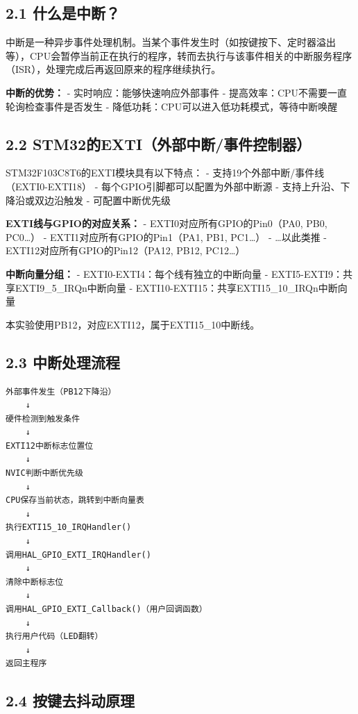 \documentclass[
  chinese,
  UTF8,
  oneside,
  openany]{ctexbook}
\begin{document}
\subsection{2.1 什么是中断？}\label{ux4ec0ux4e48ux662fux4e2dux65ad}

中断是一种异步事件处理机制。当某个事件发生时（如按键按下、定时器溢出等），CPU会暂停当前正在执行的程序，转而去执行与该事件相关的中断服务程序（ISR），处理完成后再返回原来的程序继续执行。

\textbf{中断的优势：} - 实时响应：能够快速响应外部事件 -
提高效率：CPU不需要一直轮询检查事件是否发生 -
降低功耗：CPU可以进入低功耗模式，等待中断唤醒

\subsection{2.2
STM32的EXTI（外部中断/事件控制器）}\label{stm32ux7684extiux5916ux90e8ux4e2dux65adux4e8bux4ef6ux63a7ux5236ux5668}

STM32F103C8T6的EXTI模块具有以下特点： -
支持19个外部中断/事件线（EXTI0-EXTI18） -
每个GPIO引脚都可以配置为外部中断源 - 支持上升沿、下降沿或双边沿触发 -
可配置中断优先级

\textbf{EXTI线与GPIO的对应关系：} - EXTI0对应所有GPIO的Pin0（PA0, PB0,
PC0\ldots） - EXTI1对应所有GPIO的Pin1（PA1, PB1, PC1\ldots） -
\ldots 以此类推 - EXTI12对应所有GPIO的Pin12（PA12, PB12, PC12\ldots）

\textbf{中断向量分组：} - EXTI0-EXTI4：每个线有独立的中断向量 -
EXTI5-EXTI9：共享EXTI9\_5\_IRQn中断向量 -
EXTI10-EXTI15：共享EXTI15\_10\_IRQn中断向量

本实验使用PB12，对应EXTI12，属于EXTI15\_10中断线。

\subsection{2.3
中断处理流程}\label{ux4e2dux65adux5904ux7406ux6d41ux7a0b}

\begin{verbatim}
外部事件发生（PB12下降沿）
    ↓
硬件检测到触发条件
    ↓
EXTI12中断标志位置位
    ↓
NVIC判断中断优先级
    ↓
CPU保存当前状态，跳转到中断向量表
    ↓
执行EXTI15_10_IRQHandler()
    ↓
调用HAL_GPIO_EXTI_IRQHandler()
    ↓
清除中断标志位
    ↓
调用HAL_GPIO_EXTI_Callback()（用户回调函数）
    ↓
执行用户代码（LED翻转）
    ↓
返回主程序
\end{verbatim}

\subsection{2.4
按键去抖动原理}\label{ux6309ux952eux53bbux6296ux52a8ux539fux7406}
\end{document}
